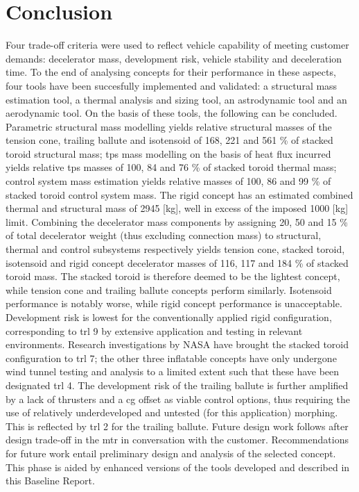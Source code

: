 \section{Conclusion}\label{cha:conclusion}
Four trade-off criteria were used to reflect vehicle capability of meeting customer demands: decelerator mass, development risk, vehicle stability and deceleration time. To the end of analysing concepts for their performance in these aspects, four tools have been succesfully implemented and validated: a structural mass estimation tool, a thermal analysis and sizing tool, an astrodynamic tool and an aerodynamic tool. On the basis of these tools, the following can be concluded.
\newline
\newline
Parametric structural mass modelling yields relative structural masses of the tension cone, trailing ballute and isotensoid of 168, 221 and 561 \% of stacked toroid structural mass; \acrfull{tps} mass modelling on the basis of heat flux incurred yields relative \gls{tps} masses of 100, 84 and 76 \% of stacked toroid thermal mass; control system mass estimation yields relative masses of 100, 86 and 99 \% of stacked toroid control system mass. The rigid concept has an estimated combined thermal and structural mass of 2945 [kg], well in excess of the imposed 1000 [kg] limit. Combining the decelerator mass components by assigning 20, 50 and 15 \% of total decelerator weight (thus excluding connection mass) to structural, thermal and control subsystems respectively yields tension cone, stacked toroid, isotensoid and rigid concept decelerator masses of 116, 117 and 184 \% of stacked toroid mass. The stacked toroid is therefore deemed to be the lightest concept, while tension cone and trailing ballute concepts perform similarly. Isotensoid performance is notably worse, while rigid concept performance is unacceptable.
\newline
\newline
Development risk is lowest for the conventionally applied rigid configuration, corresponding to \acrfull{trl} 9 by extensive application and testing in relevant environments. Research investigations by NASA have brought the stacked toroid configuration to \gls{trl} 7; the other three inflatable concepts have only undergone wind tunnel testing and analysis to a limited extent such that these have been designated \gls{trl} 4. The development risk of the trailing ballute is further amplified by a lack of thrusters and a \gls{cg} offset as viable control options, thus requiring the use of relatively underdeveloped and untested (for this application) morphing. This is reflected by \gls{trl} 2 for the trailing ballute.
\newline
{}
\newline
\newline
Future design work follows after design trade-off in the \acrfull{mtr} in conversation with the customer. Recommendations for future work entail preliminary design and analysis of the selected concept. This phase is aided by enhanced versions of the tools developed and described in this Baseline Report. 




